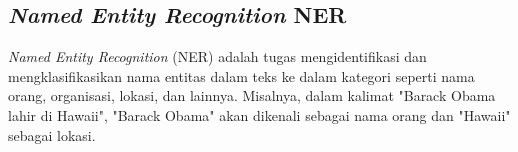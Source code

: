 \subsection{\textit{Named Entity Recognition} NER}

\textit{Named Entity Recognition} (NER) adalah tugas mengidentifikasi dan mengklasifikasikan nama entitas dalam teks ke dalam kategori seperti nama orang, organisasi, lokasi, dan lainnya. Misalnya, dalam kalimat "Barack Obama lahir di Hawaii", "Barack Obama" akan dikenali sebagai nama orang dan "Hawaii" sebagai lokasi.
